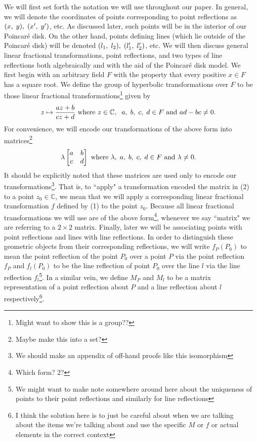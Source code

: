 \documentclass[12pt]{article}
\newcommand{\C}{\mathbb{C}}
\newcommand{\poincare}{Poincar\'{e} }
\newcommand{\ttc}{, \hspace{1mm}}
\newcommand{\lftmat}[4]{\begin{bmatrix} {#1} & {#2} \\ {#3} & {#4} \end{bmatrix}}
\newcommand{\stanlftmat}{\lftmat{a}{b}{c}{d}}
\theoremstyle{plain}
\theoremstyle{definition}
\begin{document}
We will first set forth the notation we will use throughout our paper. In general, we will denote the coordinates of points corresponding to point reflections as $(x \ttc y) \ttc (x' \ttc y')$, etc. As discussed later, such points will be in the interior of our \poincare disk. On the other hand, points defining lines (which lie outside of the \poincare disk) will be denoted $(l_1 \ttc l_2) \ttc (l_1' \ttc l_2')$, etc. We will then discuss general linear fractional transformations, point reflections, and two types of line reflections both algebraically and with the aid of the \poincare disk model. We first begin with an arbitrary field $F$ with the property that every positive $x \in F$ has a square root. We define the group of hyperbolic transformations over $F$ to be those linear fractional transformations\footnote{Might want to show this is a group??} given by
\begin{equation} 
	z \mapsto \frac{az+b}{cz+d} \text{ where } z \in \C, \hspace{2mm} a \ttc b \ttc c \ttc d \in F \text{ and } ad-bc \neq 0. 
\end{equation}
For convenience, we will encode our transformations of the above form into matrices\footnote{Maybe make this into a set?} 
\begin{equation}
	\lambda \stanlftmat \text{ where } \lambda \ttc a \ttc b \ttc c \ttc d \in F \text{ and } \lambda \neq 0. 
\end{equation}
It should be explicitly noted that these matrices are used only to encode our transformations\footnote{We should make an appendix of off-hand proofs like this isomorphism}. That is, to ``apply" a transformation encoded the matrix in (2) to a point $z_0 \in \C$, we mean that we will apply a corresponding linear fractional transformation $f$ defined by (1) to the point $z_0$. Because all linear fractional transformations we will use are of the above form\footnote{Which form? 2?}, whenever we say ``matrix" we are referring to a $2 \times 2$ matrix. Finally, later we will be associating points with point reflections and lines with line reflections. In order to distinguish these geometric objects from their corresponding reflections, we will write $f_P(P_0)$ to mean the point reflection of the point $P_0$ over a point $P$ via the point reflection $f_P$ and $f_l(P_0)$ to be the line reflection of point $P_0$ over the line $l$ via the line reflection $f_l$\footnote{We might want to make note somewhere around here about the uniqueness of points to their point reflections and similarly for line reflections}. In a similar vein, we define $M_P$ and $M_l$ to be a matrix representation of a point reflection about $P$ and a line reflection about $l$ respectively\footnote{I think the solution here is to just be careful about when we are talking about the items we're talking about and use the specific $M$ or $f$ or actual elements in the correct context}.
\end{document}
